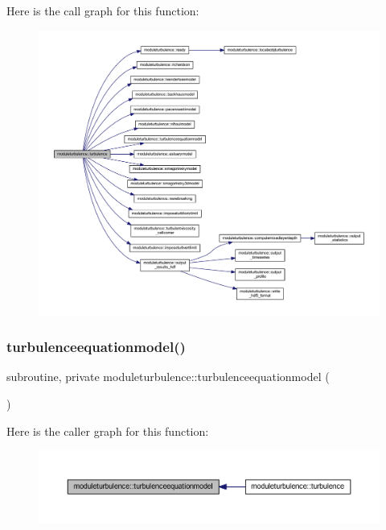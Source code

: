 Here is the call graph for this function\+:\nopagebreak
\begin{figure}[H]
\begin{center}
\leavevmode
\includegraphics[width=350pt]{namespacemoduleturbulence_aa75d43b0bd3a1b14c9baa4fe1ba2e6f7_cgraph}
\end{center}
\end{figure}
\mbox{\label{namespacemoduleturbulence_ab1caba5ca0b728449a98a3884fda59e8}} 
\subsubsection{\texorpdfstring{turbulenceequationmodel()}{turbulenceequationmodel()}}
{\footnotesize\ttfamily subroutine, private moduleturbulence\+::turbulenceequationmodel (\begin{DoxyParamCaption}{ }\end{DoxyParamCaption})\hspace{0.3cm}{\ttfamily [private]}}

Here is the caller graph for this function\+:\nopagebreak
\begin{figure}[H]
\begin{center}
\leavevmode
\includegraphics[width=350pt]{namespacemoduleturbulence_ab1caba5ca0b728449a98a3884fda59e8_icgraph}
\end{center}
\end{figure}
\mbox{\label{namespacemoduleturbulence_ad051a97467f11a69e59b2a477e516ba9}} 

